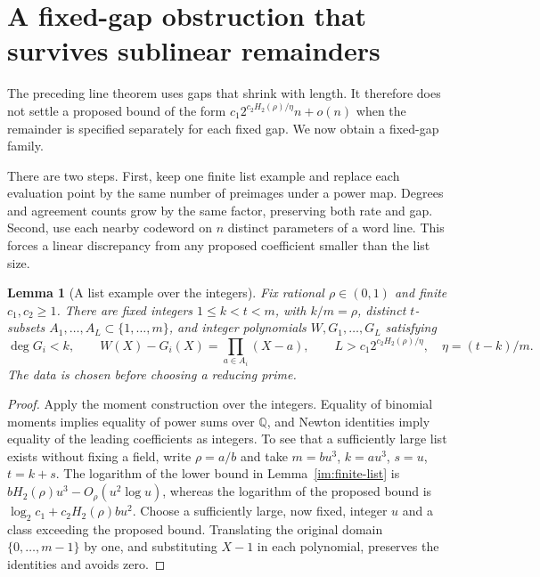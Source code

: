 \documentclass[11pt,letterpaper]{article}
\newtheorem{lemma}[theorem]{Lemma}
\theoremstyle{definition}
\theoremstyle{remark}
\begin{document}


\section{A fixed-gap obstruction that survives sublinear remainders}
\label{sec:lift}\label{fg:section}

The preceding line theorem uses gaps that shrink with length. It therefore
does not settle a proposed bound of the form
$c_1 2^{c_2H_2(\rho)/\eta}n+o(n)$ when the remainder is specified separately
for each fixed gap. We now obtain a fixed-gap family.

There are two steps. First, keep one finite list example and replace each
evaluation point by the same number of preimages under a power map. Degrees
and agreement counts grow by the same factor, preserving both rate and gap.
Second, use each nearby codeword on $n$ distinct parameters of a word line.
This forces a linear discrepancy from any proposed coefficient smaller
than the list size.

\begin{lemma}[A list example over the integers]\label{fg:seed}
Fix rational $\rho\in(0,1)$ and finite $c_1,c_2\ge1$.
There are fixed integers $1\le k<t<m$, with $k/m=\rho$, distinct
$t$-subsets $A_1,\ldots,A_L\subset\{1,\ldots,m\}$, and integer
polynomials $W,G_1,\ldots,G_L$ satisfying
\[
 \deg G_i<k,\qquad W(X)-G_i(X)=\prod_{a\in A_i}(X-a),\qquad
 L>c_1 2^{c_2H_2(\rho)/\eta},\quad\eta=(t-k)/m.
\]
The data is chosen before choosing a reducing prime.
\end{lemma}
\begin{proof}
Apply the moment construction over the integers. Equality of binomial
moments implies equality of power sums over $\mathbb Q$, and Newton
identities imply equality of the leading coefficients as integers.
To see that a sufficiently large list exists without fixing a field,
write $\rho=a/b$ and take $m=bu^3$, $k=au^3$, $s=u$, $t=k+s$.
The logarithm of the lower bound in Lemma~\ref{im:finite-list} is
$bH_2(\rho)u^3-O_\rho(u^2\log u)$, whereas the logarithm of the proposed
bound is $\log_2c_1+c_2H_2(\rho)bu^2$. Choose a sufficiently large,
now fixed, integer $u$ and a class exceeding the proposed bound.
Translating the original domain $\{0,\ldots,m-1\}$ by one, and substituting
$X-1$ in each polynomial, preserves the identities and avoids zero.
\end{proof}
\end{document}
